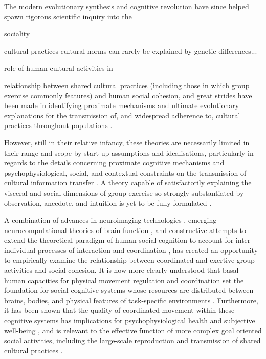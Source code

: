 The modern evolutionary synthesis and cognitive revolution have since helped spawn rigorous scientific inquiry into the

sociality

cultural practices
cultural norms can rarely be explained by genetic differences...

 role of human cultural activities in

 relationship between shared cultural practices (including those in which group exercise commonly features) and human social cohesion, and great strides have been made in identifying proximate mechanisms and ultimate evolutionary explanations for the transmission of, and widespread adherence to, cultural practices throughout populations \citep{Dawkins1976,Boyd1988,Sperber1996,Barrett2002,Whitehouse2004,Whitehouse2014,Henrich2007}.

 However, still in their relative infancy, these theories are necessarily limited in their range and scope by start-up assumptions and idealisations, particularly in regards to the details concerning proximate cognitive mechanisms and psychophysiological, social, and contextual constraints on the transmission of cultural information transfer \citep{Sperber1996,Dunbar2012,Claidiere2014}. A theory capable of satisfactorily explaining the visceral and social dimensions of group exercise so strongly substantiated by observation, anecdote, and intuition is yet to be fully formulated \citep{Cohen2017}.

A combination of advances in neuroimaging technologies \citep{Frith2007}, emerging neurocomputational theories of brain function \citep{Friston2010,Frith2010,Clark2013}, and constructive attempts to extend the theoretical paradigm of human social cognition to account for inter-individual processes of interaction and coordination \citep{Sebanz2006,Dale2014}, has created an opportunity to empirically examine the relationship between coordinated and exertive group activities and social cohesion.  It is now more clearly understood that basal human capacities for physical movement regulation and coordination set the foundation for social cognitive systems whose resources are distributed between brains, bodies, and physical features of task-specific environments \citep{Hutchins2000,Kirsh2006,Semin2008,Semin2012,Coey2012}.  Furthermore, it has been shown that the quality of coordinated movement within these cognitive systems has implications for psychophysiological health and subjective well-being \citep{Wheatley2012}, and is relevant to the effective function of more complex goal oriented social activities, including the large-scale reproduction and transmission of shared cultural practices \citep{Dunbar2012,Roepstorff2010,Claidiere2014,Launay2016}.

